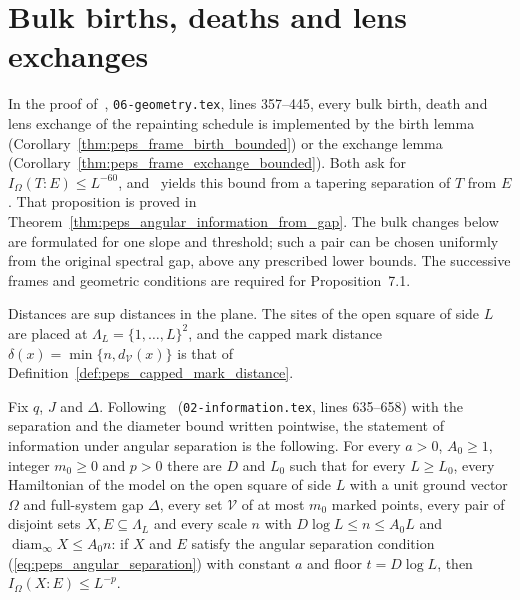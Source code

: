 \section{Bulk births, deaths and lens exchanges}
\label{sec:peps_bulk_steps}
In the proof of~\cite[Proposition~7.1]{OpenAI2026PolynomialPEPS},
\texttt{06-geometry.tex}, lines 357--445, every bulk birth, death and lens
exchange of the repainting schedule is implemented by the birth lemma
(Corollary~\ref{thm:peps_frame_birth_bounded}) or the exchange lemma
(Corollary~\ref{thm:peps_frame_exchange_bounded}). Both ask for
$I_\Omega(T:E)\le L^{-60}$, and~\cite[Proposition~3.4]{OpenAI2026PolynomialPEPS}
yields this bound from a tapering separation of $T$ from $E$. That
proposition is proved in Theorem~\ref{thm:peps_angular_information_from_gap}.
The bulk changes below are formulated for one slope and threshold; such a pair
can be chosen uniformly from the original spectral gap, above any prescribed
lower bounds. The successive frames and geometric conditions are
required for Proposition~7.1.

Distances are sup distances in the plane. The sites of the open square of side
$L$ are placed at $\Lambda_L=\{1,\dots,L\}^2$, and the capped mark distance
$\delta(x)=\min\{n,d_{\mathcal V}(x)\}$ is that of
Definition~\ref{def:peps_capped_mark_distance}.

\begin{definition}
    \label{def:peps_angular_information_bound}
    \leanok
    Fix $q$, $J$ and $\Delta$. Following~\cite[Proposition~3.4]{OpenAI2026PolynomialPEPS}
    (\texttt{02-information.tex}, lines 635--658) with the separation and the
    diameter bound written pointwise, the statement of information under angular
    separation is the following. For every $a>0$, $A_0\ge1$, integer
    $m_0\ge0$ and $p>0$ there are $D$ and $L_0$ such that for every
    $L\ge L_0$, every Hamiltonian of the model on the open square of side $L$
    with a unit ground vector $\Omega$ and full-system gap $\Delta$, every set
    $\mathcal V$ of at most $m_0$ marked points, every pair of disjoint sets
    $X,E\subseteq\Lambda_L$ and every scale $n$ with
    $D\log L\le n\le A_0L$ and $\operatorname{diam}_\infty X\le A_0n$: if
    $X$ and $E$ satisfy the angular separation condition
    (\ref{eq:peps_angular_separation}) with constant $a$ and floor
    $t=D\log L$, then $I_\Omega(X:E)\le L^{-p}$.
\end{definition}

